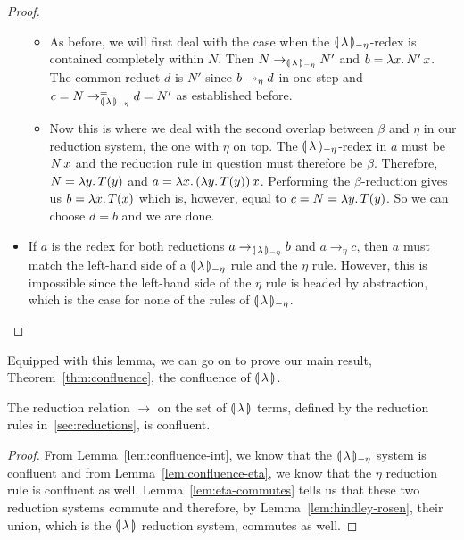 \begin{proof}
\begin{itemize}
\begin{itemize}
    \item As before, we will first deal with the case when the
      ${\llparenthesis \, \lambda \, \rrparenthesis_{-\eta}}$-redex is contained completely within $N$. Then
      $N \to_{{\llparenthesis \, \lambda \, \rrparenthesis_{-\eta}}} N'$ and $b = \lambda x.\, N'\,x$. The common
      reduct $d$ is $N'$ since $b \twoheadrightarrow_\eta d$ in one step and
      $c = N \to_{{\llparenthesis \, \lambda \, \rrparenthesis_{-\eta}}}^= d = N'$ as established before.
    \item Now this is where we deal with the second overlap between $\beta$
      and $\eta$ in our reduction system, the one with $\eta$ on top. The
      ${\llparenthesis \, \lambda \, \rrparenthesis_{-\eta}}$-redex in $a$ must be $N\,x$ and the reduction rule in
      question must therefore be $\beta$. Therefore, $N = \lambda y.\, T(y)$
      and $a = \lambda x.\, (\lambda y.\, T(y))\,x$. Performing the
      $\beta$-reduction gives us $b = \lambda x.\, T(x)$ which is, however,
      equal to $c = N = \lambda y.\, T(y)$. So we can choose $d = b$ and we are
      done.
    \end{itemize}
  \item If $a$ is the redex for both reductions $a \to_{{\llparenthesis \, \lambda \, \rrparenthesis_{-\eta}}} b$ and
    $a \to_\eta c$, then $a$ must match the left-hand side of a ${\llparenthesis \, \lambda \, \rrparenthesis_{-\eta}}$
    rule and the $\eta$ rule. However, this is impossible since the
    left-hand side of the $\eta$ rule is headed by abstraction, which is
    the case for none of the rules of ${\llparenthesis \, \lambda \, \rrparenthesis_{-\eta}}$.
  \end{itemize}
\end{proof}

Equipped with this lemma, we can go on to prove our main result,
Theorem~\ref{thm:confluence}, the confluence of $\llparenthesis \, \lambda \, \rrparenthesis$.

\begin{theorem}\label{thm:confluence}
  
  The reduction relation $\to$ on the set of $\llparenthesis \, \lambda \, \rrparenthesis$ terms,
  defined by the reduction rules in~\ref{sec:reductions}, is confluent.
\end{theorem}

\begin{proof}
  From Lemma~\ref{lem:confluence-int}, we know that the
  $\llparenthesis \, \lambda \, \rrparenthesis_{-\eta}$ system is confluent and from
  Lemma~\ref{lem:confluence-eta}, we know that the $\eta$ reduction rule is
  confluent as well. Lemma~\ref{lem:eta-commutes} tells us that these two
  reduction systems commute and therefore, by
  Lemma~\ref{lem:hindley-rosen}, their union, which is the
  $\llparenthesis \, \lambda \, \rrparenthesis$ reduction system, commutes as well.
\end{proof}


